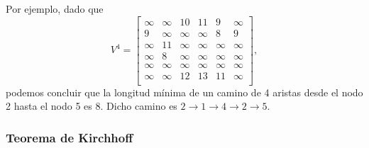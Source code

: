 Por ejemplo, dado que
\[
V^4= \begin{bmatrix}
  \infty & \infty & 10 & 11 & 9 & \infty \\
  9 & \infty & \infty & \infty & 8 & 9 \\
  \infty & 11 & \infty & \infty & \infty & \infty \\
  \infty & 8 & \infty & \infty & \infty & \infty \\
  \infty & \infty & \infty & \infty & \infty & \infty \\
  \infty & \infty & 12 & 13 & 11 & \infty \\
 \end{bmatrix},
\]
podemos concluir que la longitud mínima de un camino
de 4 aristas
desde el nodo 2 hasta el nodo 5 es 8.
Dicho camino es
$2 \rightarrow 1 \rightarrow 4 \rightarrow 2 \rightarrow 5$.

\subsubsection{Teorema de Kirchhoff}


